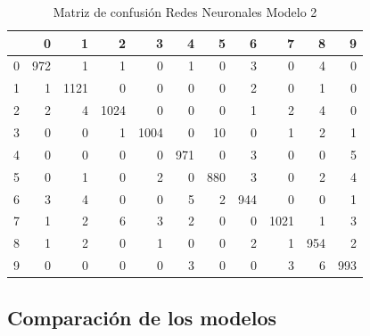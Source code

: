 \documentclass{article}
\begin{document}
\begin{table}[H]
\caption{\small{Matriz de confusión Redes Neuronales Modelo 2}}
\centering
\begin{tabular}{rrrrrrrrrrr}
  \hline
 & 0 & 1 & 2 & 3 & 4 & 5 & 6 & 7 & 8 & 9 \\ 
  \hline
0 & 972 &   1 &   1 &   0 &   1 &   0 &   3 &   0 &   4 &   0 \\ 
  1 &   1 & 1121 &   0 &   0 &   0 &   0 &   2 &   0 &   1 &   0 \\ 
  2 &   2 &   4 & 1024 &   0 &   0 &   0 &   1 &   2 &   4 &   0 \\ 
  3 &   0 &   0 &   1 & 1004 &   0 &  10 &   0 &   1 &   2 &   1 \\ 
  4 &   0 &   0 &   0 &   0 & 971 &   0 &   3 &   0 &   0 &   5 \\ 
  5 &   0 &   1 &   0 &   2 &   0 & 880 &   3 &   0 &   2 &   4 \\ 
  6 &   3 &   4 &   0 &   0 &   5 &   2 & 944 &   0 &   0 &   1 \\ 
  7 &   1 &   2 &   6 &   3 &   2 &   0 &   0 & 1021 &   1 &   3 \\ 
  8 &   1 &   2 &   0 &   1 &   0 &   0 &   2 &   1 & 954 &   2 \\ 
  9 &   0 &   0 &   0 &   0 &   3 &   0 &   0 &   3 &   6 & 993 \\ 
   \hline
\end{tabular}
\end{table}


\subsection{Comparación de los modelos}
\end{document}
